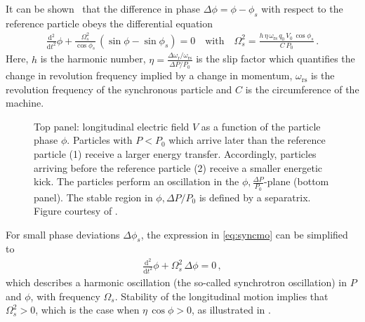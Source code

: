 It can be shown~\cite{CAS2013} that the difference in phase $\Delta \phi = \phi - \phi_s$ with respect to the reference particle obeys the differential equation
%
\begin{align}
  \frac{ \mathrm{d}^2}{\mathrm{d} t^2 } \phi + \frac{\Omega_s^2}{\cos \phi_s} \, ( \sin \phi - \sin \phi_s ) = 0 \quad \text{with} \quad \Omega_s^2 = \frac{h \, \eta \, \omega_\text{rs} \, q_0 \, V_0 \, \cos \phi_s}{ C \, P_0} \, . \label{eq:syncmo}
\end{align}
Here, $h$ is the harmonic number, $\eta = \frac{\Delta \omega_\text{r}/\omega_\text{rs}}{\Delta P / P_0}$ is the slip factor which quantifies the change in revolution frequency implied by a change in momentum, $\omega_\text{rs}$ is the revolution frequency of the synchronous particle and $C$ is the circumference of the machine. 


\begin{figure}[t]
  \centering
  \caption{Top panel: longitudinal electric field $V$ as a function of the particle phase $\phi$. Particles with $P<P_0$ which arrive later than the reference particle (1) receive a larger energy transfer. Accordingly, particles arriving before the reference particle (2) receive a smaller energetic kick. The particles perform an oscillation in the $\phi, \frac{\Delta P}{P_0}$-plane (bottom panel). The stable region in $\phi, \Delta P/P_0$ is defined by a separatrix. Figure courtesy of \cite{CAS2013}.}  
  \label{pic:16081703}
  \end{figure}

For small phase deviations $\Delta \phi_s$, the expression in \eqref{eq:syncmo} can be simplified to~\cite{CAS2013}
%
\begin{align}
  \frac{ \mathrm{d}^2}{\mathrm{d} t^2 } \phi + \Omega_s^2 \,  \Delta \phi = 0 \, ,
\end{align}
which describes a harmonic oscillation (the so-called synchrotron oscillation) in $P$ and $\phi$, with frequency $\Omega_s$. Stability of the longitudinal motion implies that $\Omega_s^2>0$, which is the case when $\eta \, \cos \phi>0$, as illustrated in .


